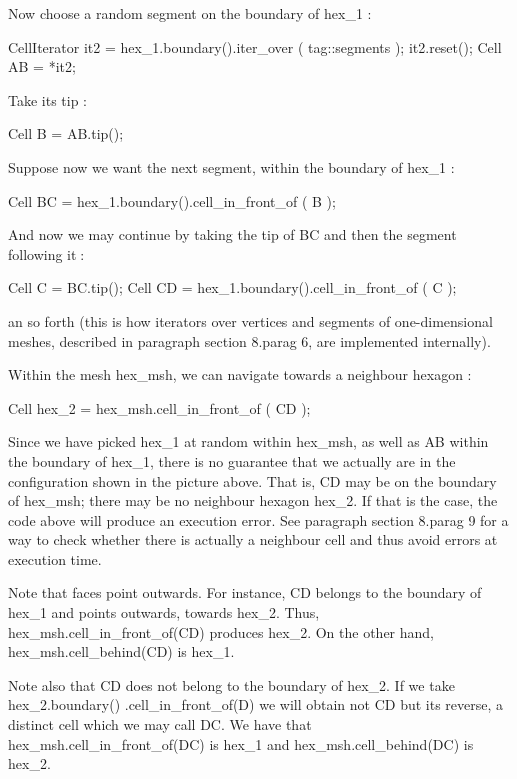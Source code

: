 {Now choose a random segment on the boundary of {\codett hex\_1} :

\verbatim
   CellIterator it2 = hex_1.boundary().iter_over ( tag::segments );
   it2.reset();
   Cell AB = *it2;
\endverbatim

Take its tip :

\verbatim
   Cell B = AB.tip();
\endverbatim

Suppose now we want the next segment, within the boundary of {\codett hex\_1} :

\verbatim
   Cell BC = hex_1.boundary().cell_in_front_of ( B );
\endverbatim

And now we may continue by taking the tip of {\codett BC} and then the segment
following it$\;$:

\verbatim
   Cell C = BC.tip();
   Cell CD = hex_1.boundary().cell_in_front_of ( C );
\endverbatim

\noindent an so forth (this is how iterators over vertices and segments of
one-dimensional meshes, described in paragraph \numb section 8.\numb parag 6,
are implemented internally).

Within the mesh {\codett hex\_msh}, we can navigate towards a neighbour hexagon :

\verbatim
   Cell hex_2 = hex_msh.cell_in_front_of ( CD );
\endverbatim

Since we have picked {\codett hex\_1} at random within {\codett hex\_msh},
as well as {\codett AB} within the boundary of {\codett hex\_1},
there is no guarantee that we actually are in the configuration shown in the
picture above.
That is, {\codett CD} may be on the boundary of {\codett hex\_msh};
there may be no neighbour hexagon {\codett hex\_2}.
If that is the case, the code above will produce an execution error.
See paragraph \numb section 8.\numb parag 9 for a way to check whether there is actually
a neighbour cell and thus avoid errors at execution time.

Note that faces point outwards.
For instance, {\codett CD} belongs to the boundary of {\codett hex\_1} and points
outwards, towards {\codett hex\_2}.
Thus, {\codett hex\_msh.cell\_in\_front\_of(CD)} produces {\codett hex\_2}.
On the other hand, {\codett hex\_msh.cell\_behind(CD)} is {\codett hex\_1}.

Note also that {\codett CD} does not belong to the boundary of {\codett hex\_2}.
If we take {\codett hex\_2.boundary() .cell\_in\_front\_of(D)} we will obtain not
{\codett CD} but its reverse, a distinct cell which we may call {\codett DC}.
We have that {\codett hex\_msh.cell\_in\_front\_of(DC)} is {\codett hex\_1} and
{\codett hex\_msh.cell\_behind(DC)} is {\codett hex\_2}.


}
